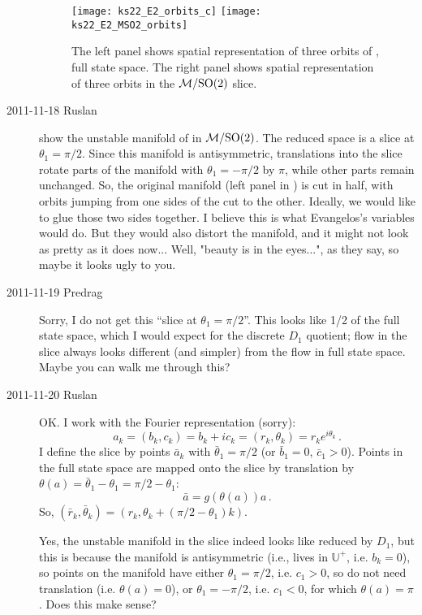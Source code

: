 \begin{description}
\begin{figure}[ht]
\begin{center}
\texttt{[image: ks22\_E2\_orbits\_c]}
\texttt{[image: ks22\_E2\_MSO2\_orbits]}
\end{center}
\caption{
The left panel shows spatial representation of three orbits of
, full state space. The right panel shows spatial
representation of three orbits in the ${\cal M}/\textrm{SO}(2)$ slice.
       }
\label{f:ks22_E2_MSO2}
\end{figure}

\item[2011-11-18 Ruslan]  show the
unstable manifold of  in ${\cal M}/\textrm{SO}(2)$. The reduced space is a
slice at $\theta_1 = \pi/2$. Since this manifold is antisymmetric,
translations into the slice rotate parts of the manifold with $\theta_1 =
-\pi/2$ by $\pi$, while other parts remain unchanged.  So, the original
manifold (left panel in ) is cut in half, with
orbits jumping from one sides of the cut to the other.  Ideally, we would
like to glue those two sides together. I believe this is what Evangelos's
variables would do.  But they would also distort the manifold, and it
might not look as pretty as it does now... Well, "beauty is in the
eyes...", as they say, so maybe it looks ugly to you.

\item[2011-11-19 Predrag] Sorry, I do not get this ``slice at $\theta_1 =
\pi/2$''. This looks like 1/2 of the full state space, which I would expect
for the discrete $D_1$ quotient; flow in the slice always looks different
(and simpler) from the flow in full state space. Maybe you can walk me
through this?

\item[2011-11-20 Ruslan] OK. I work with the Fourier representation (sorry):
\[ a_k = (b_k, c_k) = b_k + ic_k = (r_k, \theta_k) = r_k e^{i\theta_k}\,. \]
I define the slice by points $\bar{a}_k$ with $\bar{\theta}_1 = \pi/2$  (or $\bar{b}_1 = 0$, $\bar{c}_1 > 0$).  Points in the full state space are mapped onto the slice by translation by $\theta(a) = \bar{\theta}_1 - \theta_1 = \pi/2 - \theta_1$:
\[ \bar{a} = g(\theta(a)) a\,. \]
So, $(\bar{r}_k, \bar{\theta}_k) = (r_k, \theta_k + (\pi/2 - \theta_1)k)$.

Yes, the  unstable manifold in the slice indeed looks like reduced by $D_1$, but this is because the manifold is antisymmetric (i.e., lives in $\mathbb{U}^+$, i.e. $b_k = 0$), so points on the manifold have either $\theta_1 = \pi/2$, i.e. $c_1 > 0$, so do not need translation (i.e. $\theta(a) = 0$), or $\theta_1 = -\pi/2$, i.e. $c_1 < 0$, for which $\theta(a) = \pi$.  Does this make sense?


\end{description}
